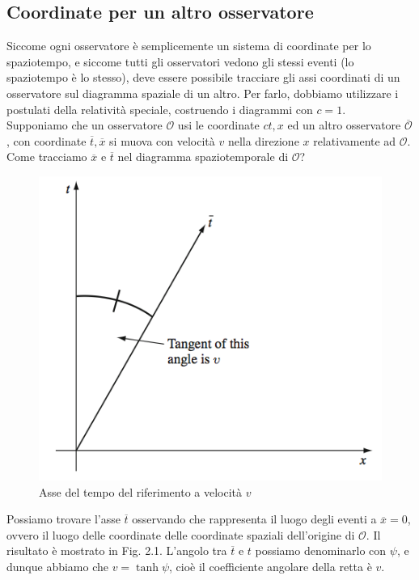 \documentclass[a4paper,11pt]{book}
\theoremstyle{plain}
\theoremstyle{definition}
\begin{document}
\subsection{Coordinate per un altro osservatore}
Siccome ogni osservatore è semplicemente un sistema di coordinate per lo spaziotempo, e siccome tutti gli osservatori vedono gli stessi eventi (lo spaziotempo è lo stesso), deve essere possibile tracciare gli assi coordinati di un osservatore sul diagramma spaziale di un altro. Per farlo, dobbiamo utilizzare i postulati della relatività speciale, costruendo i diagrammi con $c=1$. \\
Supponiamo che un osservatore $\mathcal{O}$ usi le coordinate $ct,x$ ed un altro osservatore $\overline{\mathcal{O}}$, con coordinate $\overline{t},\overline{x}$ si muova con velocità $v$ nella direzione $x$ relativamente ad $\mathcal{O}$.  Come tracciamo $\overline{x}$ e $\overline{t}$ nel diagramma spaziotemporale di $\mathcal{O}$? 
\begin{figure}[!h]
\centering
\includegraphics[scale=0.45]{x,t}
\caption{Asse del tempo del riferimento a velocità $v$}
\end{figure}
Possiamo trovare l'asse $\overline{t}$ osservando che rappresenta il luogo degli eventi a $\overline{x}=0$, ovvero il luogo delle coordinate delle coordinate spaziali dell'origine di $\mathcal{O}$. Il risultato è mostrato in Fig. 2.1. L'angolo tra $\overline{t}$ e $t$ possiamo denominarlo con $\psi$, e dunque abbiamo che $v=\tanh\psi$, cioè il coefficiente angolare della retta è $v$. \\
\end{document}
